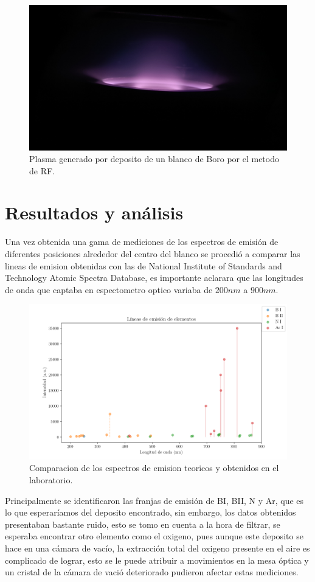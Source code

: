 \documentclass[12pt]{IEEEtran}
\begin{document}
\begin{figure}[htp]
	\centering
	\includegraphics[width=0.8\linewidth]{figs/PLASMA.jpg}
	\caption{Plasma generado por deposito de un blanco de Boro por el metodo de RF.}
	\label{fig:plasma}
\end{figure}

\section{Resultados y análisis}

Una vez obtenida una gama de mediciones de los espectros de emisión  de diferentes posiciones alrededor del centro del blanco se procedió a comparar las lineas de emision obtenidas con las de National Institute of Standards and Technology Atomic Spectra Database, es importante aclarara que las longitudes de onda que captaba en espectometro optico variaba de $200 nm $ a $900 nm$.

\begin{figure}[htp]
	\centering
	\includegraphics[width=0.9\linewidth]{descarga.png}
	\caption{Comparacion de los espectros de emision teoricos y obtenidos en el laboratorio.}
	\label{Graf:plasma}
\end{figure}

Principalmente se identificaron las franjas de emisión de BI, BII, N y Ar, que es lo que esperaríamos del deposito encontrado, sin embargo, los datos obtenidos presentaban bastante ruido, esto se tomo en cuenta a la hora de filtrar, se esperaba encontrar otro elemento como el oxigeno, pues aunque este deposito se hace en una cámara de vacío, la extracción total del oxigeno presente en el aire es complicado de lograr, esto se le puede atribuir a movimientos en la mesa óptica y un cristal de la cámara de vació deteriorado pudieron afectar estas mediciones.
\end{document}
